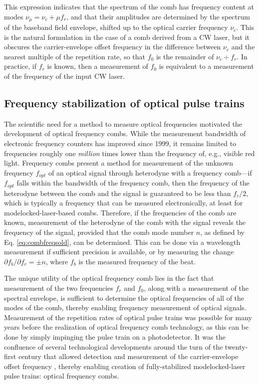 This expression indicates that the spectrum of the comb has frequency content at modes $\nu_\mu=\nu_c+\mu f_r$, and that their amplitudes are determined by the spectrum of the baseband field envelope, shifted up to the optical carrier frequency $\nu_c$. This is the natural formulation in the case of a comb derived from a CW laser, but it obscures the carrier-envelope offset frequency in the difference between $\nu_c$ and the nearest multiple of the repetition rate, so that $f_0$ is the remainder of $\nu_c\div f_r$. In practice, if $f_r$ is known, then a measurement of $f_0$ is equivalent to a measurement of the frequency of the input CW laser.


\subsection{Frequency stabilization of optical pulse trains}

The scientific need for a method to measure optical frequencies motivated the development of optical frequency combs. While the measurement bandwidth of electronic frequency counters has improved since 1999, it remains limited to frequencies roughly one \textit{million} times lower than the frequency of, e.g., visible red light. Frequency combs present a method for measurement of the unknown frequency $f_{opt}$ of an optical signal through heterodyne with a frequency comb---if $f_{opt}$ falls within the bandwidth of the frequency comb, then the frequency of the heterodyne between the comb and the signal is guaranteed to be less than $f_r/2$, which is typically a frequency that can be measured electronically, at least for modelocked-laser-based combs. Therefore, if the frequencies of the comb are known, measurement of the heterodyne of the comb with the signal reveals the frequency of the signal, provided that the comb mode number $n$, as defined by Eq. \ref{eq:combfreqsold}, can be determined. This can be done via a wavelength measurement if sufficient precision is available, or by measuring the change $\partial f_b/\partial f_r=\pm n$, where $f_b$ is the measured frequency of the beat.

The unique utility of the optical frequency comb lies in the fact that measurement of the two frequencies $f_r$ and $f_0$, along with a measurement of the spectral envelope, is sufficient to determine the optical frequencies of all of the modes of the comb, thereby enabling frequency measurement of optical signals. Measurement of the repetition rates of optical pulse trains was possible for many years before the realization of optical frequency comb technology, as this can be done by simply impinging the pulse train on a photodetector. It was the confluence of several technological developments around the turn of the twenty-first century that allowed detection and measurement of the carrier-envelope offset frequency , thereby enabling creation of fully-stabilized modelocked-laser pulse trains: optical frequency combs.

